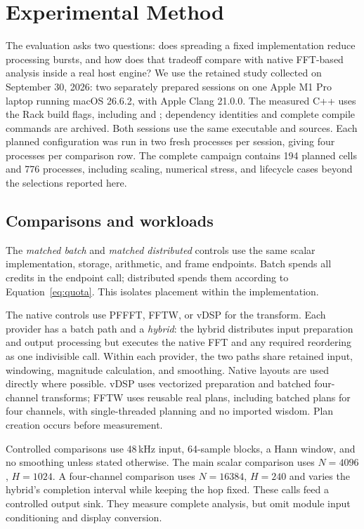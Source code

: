 \section{Experimental Method}
\label{sec:evaluation}
The evaluation asks two questions: does spreading a fixed implementation
reduce processing bursts, and how does that tradeoff compare with native
FFT-based analysis inside a real host engine? We use the retained study
collected on September 30, 2026: two separately prepared sessions on one Apple
M1 Pro laptop running macOS 26.6.2, with Apple Clang 21.0.0. The measured C++ uses the Rack build flags, including  and
; dependency identities and complete compile
commands are archived. Both sessions use the same executable and sources. Each planned configuration was
run in two fresh processes per session, giving four processes per comparison
row. The complete campaign contains 194 planned cells and 776 processes,
including scaling, numerical stress, and lifecycle cases beyond the selections
reported here.

\subsection{Comparisons and workloads}
The \emph{matched batch} and \emph{matched distributed} controls use the same
scalar implementation, storage, arithmetic, and frame endpoints. Batch spends
all credits in the endpoint call; distributed spends them according to
Equation~\eqref{eq:quota}. This isolates placement within the implementation.

The native controls use PFFFT, FFTW, or vDSP for the transform. Each provider
has a batch path and a \emph{hybrid}: the hybrid distributes input preparation
and output processing but executes the native FFT and any required reordering
as one indivisible call. Within each provider, the two paths share retained
input, windowing, magnitude calculation, and smoothing. Native layouts are
used directly where possible. vDSP uses vectorized preparation and batched
four-channel transforms; FFTW uses reusable real plans, including batched
plans for four channels, with single-threaded  planning
and no imported wisdom. Plan creation occurs before measurement.

Controlled comparisons use 48\,kHz input, 64-sample blocks, a Hann window,
and no smoothing unless stated otherwise. The main scalar comparison uses
$N=4096$, $H=1024$. A four-channel comparison uses $N=16384$, $H=240$
and varies the hybrid's completion interval while keeping the hop fixed.
These calls feed a controlled output sink. They measure complete analysis,
but omit module input conditioning and display conversion.


